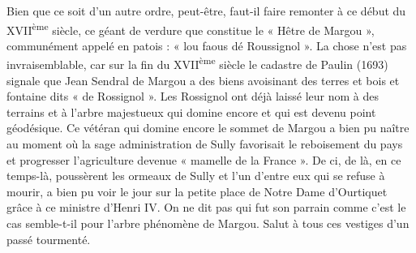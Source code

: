 

Bien que ce soit d'un autre ordre, peut-être, faut-il faire remonter à ce début du XVII\textsuperscript{ème} siècle, ce géant de verdure que constitue le « Hêtre de Margou », communément appelé en patois : « lou faous dé Roussignol ». La chose n'est pas invraisemblable, car sur la fin du XVII\textsuperscript{ème} siècle le cadastre de Paulin (1693) signale que Jean Sendral de Margou a des biens avoisinant des terres et bois et fontaine dits « de Rossignol ». Les Rossignol ont déjà laissé leur nom à des terrains et à l'arbre majestueux qui domine encore et qui est devenu point géodésique. Ce vétéran qui domine encore le sommet de Margou a bien pu naître au moment où la sage administration de Sully favorisait le reboisement du pays et progresser l'agriculture devenue « mamelle de la France ». De ci, de là, en ce temps-là, poussèrent les ormeaux de Sully et l'un d'entre eux qui se refuse à mourir, a bien pu voir le jour sur la petite place de Notre Dame d'Ourtiquet grâce à ce ministre d'Henri IV. On ne dit pas qui fut son parrain comme c'est le cas semble-t-il pour l'arbre phénomène de Margou. Salut à tous ces vestiges d'un passé tourmenté.
